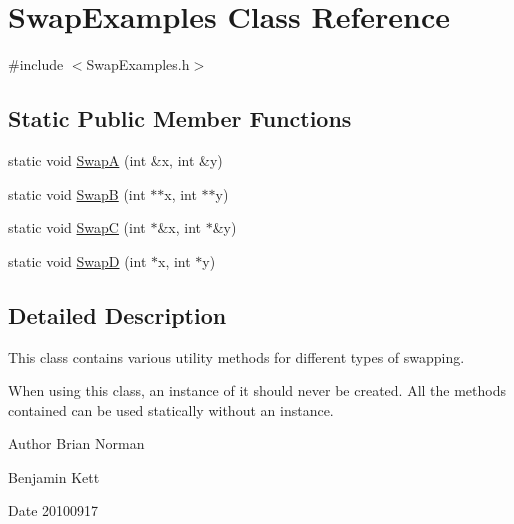 \hypertarget{classSwapExamples}{
\section{SwapExamples Class Reference}
\label{classSwapExamples}
}


{\ttfamily \#include $<$SwapExamples.h$>$}\subsection*{Static Public Member Functions}
\begin{DoxyCompactItemize}
\item 
static void \hyperlink{classSwapExamples_a5f1db10656b5afe7efffa4e7df9ad36f}{SwapA} (int \&x, int \&y)
\item 
static void \hyperlink{classSwapExamples_aa8f171680c769038e041cdd95e34115a}{SwapB} (int $\ast$$\ast$x, int $\ast$$\ast$y)
\item 
static void \hyperlink{classSwapExamples_a44e958009befa1f49bf80968ca401f45}{SwapC} (int $\ast$\&x, int $\ast$\&y)
\item 
static void \hyperlink{classSwapExamples_a50e369332f53d06620e82f195baa1f5a}{SwapD} (int $\ast$x, int $\ast$y)
\end{DoxyCompactItemize}


\subsection{Detailed Description}
This class contains various utility methods for different types of swapping.

When using this class, an instance of it should never be created. All the methods contained can be used statically without an instance.

\begin{DoxyAuthor}{Author}
Brian Norman 

Benjamin Kett
\end{DoxyAuthor}
\begin{DoxyDate}{Date}
20100917 
\end{DoxyDate}



